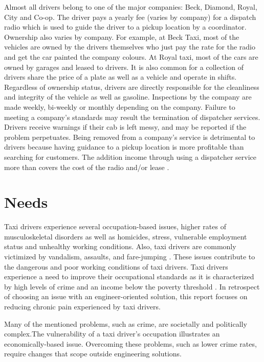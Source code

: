\documentclass[11pt]{article}
\begin{document}
Almost all drivers belong to one of the major companies: Beck, Diamond, Royal, City and
Co-op. The driver pays a yearly fee (varies by company) for a dispatch radio which is used to guide the 
driver to a pickup location by a coordinator. Ownership also varies by company. For example, 
at Beck Taxi, most of the vehicles are owned by the drivers themselves who just pay the 
rate for the radio and get the car painted the company colours. At Royal taxi, most of the 
cars are owned by garages and leased to drivers. It is also common for a collection of 
drivers share the price of a plate as well as a vehicle and operate in shifts. Regardless of   
ownership status, drivers are directly responsible for the cleanliness and integrity of the vehicle as well as gasoline. 
Inspections by the company are made weekly, bi-weekly or monthly depending on the company. 
Failure to meeting a company's standards may result the termination of dispatcher services. Drivers receive 
warnings if their cab is left messy, and may be reported if the problem perpetuates. Being removed from
a company's service is detrimental to drivers because having guidance to a pickup location
is more profitable than searching for customers. The addition income through using a dispatcher 
service more than covers the cost of the radio and/or lease \cite{thestar2012, Gowder2013}.
\section{Needs}
\label{sec:needs}

Taxi drivers experience several occupation-based issues,
higher rates of musculoskeletal disorders as well as homicides, 
stress, vulnerable employment status and unhealthy working 
conditions\cite{thxtips}. Also, taxi drivers are commonly victimized 
by vandalism, assaults, and fare-jumping \cite{policeverywherejustnowhere}.
These issues contribute to the dangerous and poor working conditions 
of taxi drivers. Taxi drivers experience a need to improve their occupational 
standards as it is characterized by high levels of crime and an income
below the poverty threshold \cite{policeverywherejustnowhere, Abdiphone}. 
In retrospect of choosing an issue with an engineer-oriented solution, 
this report focuses on reducing chronic pain experienced by taxi drivers. 

Many of the mentioned problems, such as crime, are societally and politically 
complex\cite{socialcomplex}.The vulnerability of a taxi driver’s occupation 
illustrates an economically-based issue. Overcoming these problems, such as 
lower crime rates, require changes that scope outside engineering solutions. 
\end{document}
